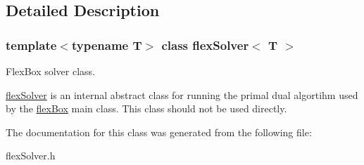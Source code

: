 \subsection{Detailed Description}
\subsubsection*{template$<$typename T$>$\newline
class flex\+Solver$<$ T $>$}

Flex\+Box solver class. 

\hyperlink{classflex_solver}{flex\+Solver} is an internal abstract class for running the primal dual algortihm used by the \hyperlink{classflex_box}{flex\+Box} main class. This class should not be used directly. 

The documentation for this class was generated from the following file\+:\begin{DoxyCompactItemize}
\item 
flex\+Solver.\+h\end{DoxyCompactItemize}
